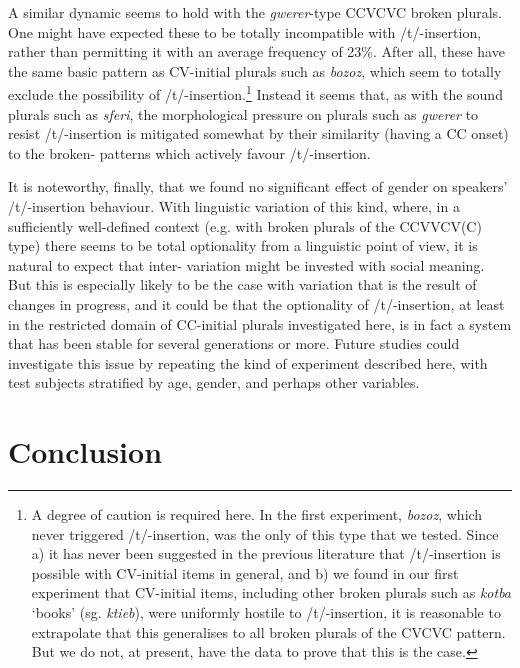 \documentclass[output=paper]{langsci/langscibook}
\begin{document}
\newpage 
A similar dynamic seems to hold with the \textit{gwerer}{}-type CCVCVC broken plurals. One might have expected these to be totally incompatible with /t/-insertion, rather than permitting it with an average frequency of 23\%. After all, these have the same basic pattern as CV-initial plurals such as \textit{bozoz}, which seem to totally exclude the possibility of /t/-insertion.\footnote{A degree of caution is required here. In the first experiment, \textit{bozoz}, which never triggered /t/-insertion, was the only  of this type that we tested. Since a) it has never been suggested in the previous literature that /t/-insertion is possible with CV-initial items in general, and b) we found in our first experiment that CV-initial items, including other broken plurals such as \textit{kotba} ‘books’ (sg. \textit{ktieb}), were uniformly hostile to /t/-insertion, it is reasonable to extrapolate that this generalises to all broken plurals of the CVCVC pattern. But we do not, at present, have the data to prove that this is the case.}  Instead it seems that, as with the sound plurals such as \textit{sferi}, the morphological pressure on plurals such as \textit{gwerer} to resist /t/-insertion is mitigated somewhat by their  similarity (having a CC onset) to the broken- patterns which actively favour /t/-insertion.  

It is noteworthy, finally, that we found no significant effect of gender on speakers’ /t/-insertion behaviour. With linguistic variation of this kind, where, in a sufficiently well-defined context (e.g. with broken plurals of the CCVVCV(C) type) there seems to be total optionality from a linguistic point of view, it is natural to expect that inter- variation might be invested with social meaning. But this is especially likely to be the case with variation that is the result of changes in progress, and it could be that the optionality of /t/-insertion, at least in the restricted domain of  CC-initial plurals investigated here, is in fact a system that has been stable for several generations or more. Future studies could investigate this issue by repeating the kind of experiment described here, with test subjects stratified by age, gender, and perhaps other  variables.

\section{Conclusion}
\end{document}

